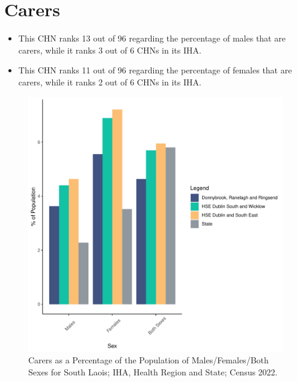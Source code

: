 \documentclass{article}
\begin{document}
\section{Carers}\label{sect:Carers}
\begin{itemize}
\item This CHN ranks  13 out of 96 regarding the percentage of males that are carers, while it ranks   3 out of 6 CHNs in its IHA.
\item This CHN ranks  11 out of 96 regarding the percentage of females that are carers, while it ranks   2 out of 6 CHNs in its IHA.
\end{itemize}
\begin{figure}[H]
	\centering
	\includegraphics[width = 150mm]{../figures/CareED.pdf}
	\caption{Carers as a Percentage of the Population of Males/Females/Both Sexes for South Laois; IHA, Health Region and State; Census 2022.}
	\label{fig:2ae19629-1a6a-13a3-e055-000000000001}
	\end{figure}
\end{document}
